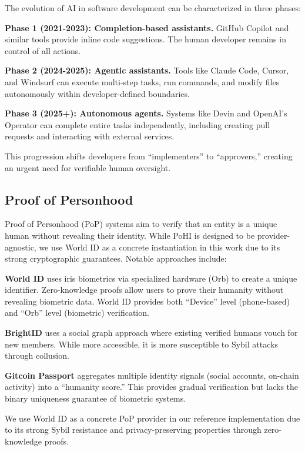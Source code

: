 \documentclass[conference]{IEEEtran}
\begin{document}
The evolution of AI in software development can be characterized in three phases:

\textbf{Phase 1 (2021-2023): Completion-based assistants.} GitHub Copilot and similar tools provide inline code suggestions. The human developer remains in control of all actions.

\textbf{Phase 2 (2024-2025): Agentic assistants.} Tools like Claude Code, Cursor, and Windsurf can execute multi-step tasks, run commands, and modify files autonomously within developer-defined boundaries.

\textbf{Phase 3 (2025+): Autonomous agents.} Systems like Devin and OpenAI's Operator can complete entire tasks independently, including creating pull requests and interacting with external services.

This progression shifts developers from ``implementers'' to ``approvers,'' creating an urgent need for verifiable human oversight.

\subsection{Proof of Personhood}

Proof of Personhood (PoP) systems aim to verify that an entity is a unique human without revealing their identity. While PoHI is designed to be provider-agnostic, we use World ID as a concrete instantiation in this work due to its strong cryptographic guarantees. Notable approaches include:

\textbf{World ID} \cite{worldid, worldcoin} uses iris biometrics via specialized hardware (Orb) to create a unique identifier. Zero-knowledge proofs allow users to prove their humanity without revealing biometric data. World ID provides both ``Device'' level (phone-based) and ``Orb'' level (biometric) verification.

\textbf{BrightID} uses a social graph approach where existing verified humans vouch for new members. While more accessible, it is more susceptible to Sybil attacks through collusion.

\textbf{Gitcoin Passport} aggregates multiple identity signals (social accounts, on-chain activity) into a ``humanity score.'' This provides gradual verification but lacks the binary uniqueness guarantee of biometric systems.

We use World ID as a concrete PoP provider in our reference implementation due to its strong Sybil resistance and privacy-preserving properties through zero-knowledge proofs.
\end{document}
